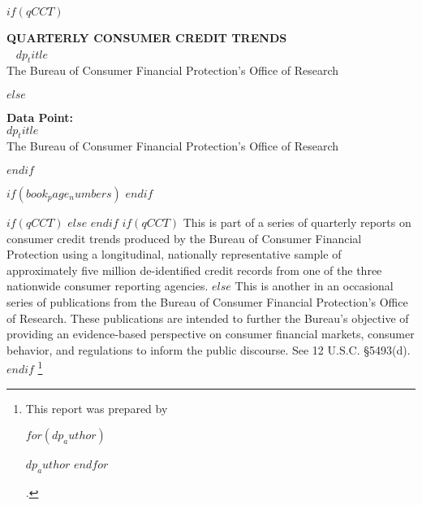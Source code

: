 \documentclass[12pt,letterpaper,twoside]{article}
\begin{document}

\begin{titlepage}
  \thispagestyle{fancy}
  \vspace*{1.5in}
  \begin{addmargin}[0in]{1in}
  $if(qCCT)$
  {\color{black}  \fontsize{10}{10} \selectfont \textbf{QUARTERLY CONSUMER CREDIT TRENDS}\\[10pt]
   \fontsize{38}{38} \selectfont $dp_title$\\[40pt]
  \fontsize{14}{14} \selectfont The Bureau of Consumer Financial Protection’s Office of Research\par}
  $else$
  {\color{black}  \fontsize{38}{38} \selectfont \textbf{Data Point:}\\[25pt]
  $dp_title$\\[40pt]
  \fontsize{14}{14} \selectfont The Bureau of Consumer Financial Protection’s Office of Research\par}
  $endif$
  \end{addmargin}

\end{titlepage}

$if(book_page_numbers)$
$endif$

\raggedright
\fancyhead[L]{}  %
\fancyfoot[R]{}
$if(qCCT)$
$else$
$endif$
$if(qCCT)$
This is part of a series of quarterly reports on consumer credit trends produced by the Bureau of Consumer Financial Protection using a longitudinal, nationally representative sample of approximately five million de-identified credit records from one of the three nationwide consumer reporting agencies.
$else$
This is another in an occasional series of publications from the Bureau of Consumer Financial Protection’s Office of Research. These publications are intended to further the Bureau’s objective of providing an evidence-based perspective on consumer financial markets, consumer behavior, and regulations to inform the public discourse. See 12 U.S.C. §5493(d).
$endif$
\footnote{This report was prepared by
\begin{itemize*}[label={}, afterlabel={}, itemjoin={,\nobreakspace}, itemjoin*={, and\nobreakspace}]
  $for(dp_author)$
    \item $dp_author$
  $endfor$
\end{itemize*}.}
\newpage
\end{document}
